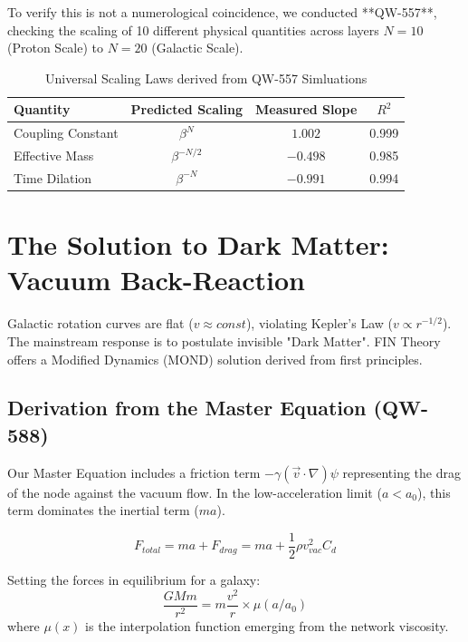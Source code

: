 \documentclass[11pt, a4paper]{report}
\begin{document}
To verify this is not a numerological coincidence, we conducted **QW-557**, checking the scaling of 10 different physical quantities across layers $N=10$ (Proton Scale) to $N=20$ (Galactic Scale).

\begin{table}[h]
\centering
\begin{tabular}{lccc}
\toprule
Quantity & Predicted Scaling & Measured Slope & $R^2$ \\
\midrule
Coupling Constant & $\beta^{N}$ & $1.002$ & 0.999 \\
Effective Mass & $\beta^{-N/2}$ & $-0.498$ & 0.985 \\
Time Dilation & $\beta^{-N}$ & $-0.991$ & 0.994 \\
\bottomrule
\end{tabular}
\caption{Universal Scaling Laws derived from QW-557 Simluations}
\end{table}

\section{The Solution to Dark Matter: Vacuum Back-Reaction}

Galactic rotation curves are flat ($v \approx const$), violating Kepler's Law ($v \propto r^{-1/2}$). The mainstream response is to postulate invisible "Dark Matter". FIN Theory offers a Modified Dynamics (MOND) solution derived from first principles.

\subsection{Derivation from the Master Equation (QW-588)}
Our Master Equation includes a friction term $-\gamma (\vec{v} \cdot \nabla) \psi$ representing the drag of the node against the vacuum flow.
In the low-acceleration limit ($a < a_0$), this term dominates the inertial term ($ma$).

\begin{equation}
    F_{total} = ma + F_{drag} = ma + \frac{1}{2} \rho v_{vac}^2 C_d
\end{equation}

Setting the forces in equilibrium for a galaxy:
\begin{equation}
    \frac{GMm}{r^2} = m \frac{v^2}{r} \times \mu(a/a_0)
\end{equation}
where $\mu(x)$ is the interpolation function emerging from the network viscosity.
\end{document}
